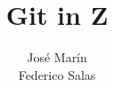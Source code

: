\documentclass{article}
\title{Git in Z}
\author{José Marín \\
  Federico Salas}
\date{}
\begin{document}
\maketitle

\tableofcontents















\nocite{*}


\end{document}
